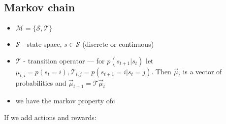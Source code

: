 \documentclass{report}
\begin{document}
\subsection{Markov chain}
\begin{figure}[htpb]
\begin{center}
\end{center}
\end{figure}
\begin{itemize}
\item $\mathcal{M} = \{\mathcal{S}, \mathcal{T}\}$
\item $\mathcal{S}$ - state space, $s \in \mathcal{S}$ (discrete or continuous)
\item $\mathcal{T}$ - transition operator --- for  $p(s_{t+1} | s_t)$ let 
		$\mu_{t,i} = p(s_t =i), \mathcal{T}_{i,j} = p(s_{t+1} = i  | s_t = j)$. 
		Then $\overrightarrow{\mu}_t$ is a vector of probabilities and 
		$\overrightarrow{\mu}_{t+1} = \mathcal{T} \overrightarrow{\mu}_t$
\item we have the markov property ofc
\end{itemize}
If we add actions and rewards:
\end{document}
